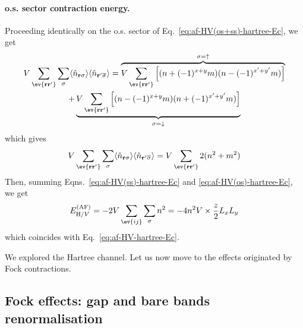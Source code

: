 \begin{tabproof}
	\paragraph{o.s. sector contraction energy.}
	
	Proceeding identically on the o.s. sector of Eq.~\eqref{eq:af-HV(os+ss)-hartree-Ec}, we get
	\begin{multline*}
		V \sum_{\ev{\mathbf{r}\mathbf{r}'}} \sum_\sigma \langle
		\hat n_{\mathbf{r}\sigma}
		\rangle \langle
		\hat n_{\mathbf{r}'\overline{\sigma}}
		\rangle = \overbrace{
			V \sum_{\ev{\mathbf{r}\mathbf{r}'}} \left[
			(
			n + (-1)^{x+y} m
			) (
			n - (-1)^{x'+y'} m
			)
			\right]
		}^{\sigma=\uparrow} \\
		+ \underbrace{
			V \sum_{\ev{\mathbf{r}\mathbf{r}'}} \left[
			(
			n - (-1)^{x+y} m
			) (
			n + (-1)^{x'+y'} m
			)
			\right]
		}_{\sigma=\downarrow}
	\end{multline*}
	which gives
	\begin{equation}\label{eq:af-HV(os)-hartree-Ec}
		V \sum_{\ev{\mathbf{r}\mathbf{r}'}} \sum_\sigma \langle
		\hat n_{\mathbf{r}\sigma}
		\rangle \langle
		\hat n_{\mathbf{r}'\overline{\sigma}}
		\rangle = V \sum_{\ev{\mathbf{r}\mathbf{r}'}} 2(
		n^2+m^2
		)
	\end{equation}
	Then, summing Eqns.~\eqref{eq:af-HV(ss)-hartree-Ec} and \eqref{eq:af-HV(os)-hartree-Ec}, we get
	\[
		E_{\mathrm{H}/V}^{(\mathrm{AF})} = - 2V \sum_{\ev{ij}} \sum_\sigma n^2 = - 4n^2 V \times \frac{z}{2} L_x L_y
	\]
	which coincides with Eq.~\eqref{eq:af-HV-hartree-Ec}.

\end{tabproof}

We explored the Hartree channel. Let us now move to the effects originated by Fock contractions.

\subsection{Fock effects: gap and bare bands renormalisation}\label{subsec:af-fock}

